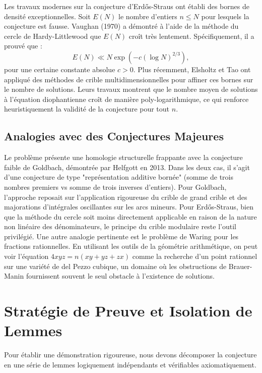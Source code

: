\documentclass[12pt, a4paper]{article}
\begin{document}
Les travaux modernes sur la conjecture d'Erd\H{o}s-Straus ont établi des bornes de densité exceptionnelles. Soit $E(N)$ le nombre d'entiers $n \le N$ pour lesquels la conjecture est fausse. Vaughan (1970) a démontré à l'aide de la méthode du cercle de Hardy-Littlewood que $E(N)$ croît très lentement. Spécifiquement, il a prouvé que :
\begin{equation}
E(N) \ll N \exp\left(-c (\log N)^{2/3}\right),
\end{equation}
pour une certaine constante absolue $c > 0$.
Plus récemment, Elsholtz et Tao ont appliqué des méthodes de crible multidimensionnelles pour affiner ces bornes sur le nombre de solutions. Leurs travaux montrent que le nombre moyen de solutions à l'équation diophantienne croît de manière poly-logarithmique, ce qui renforce heuristiquement la validité de la conjecture pour tout $n$.

\subsection{Analogies avec des Conjectures Majeures}
Le problème présente une homologie structurelle frappante avec la conjecture faible de Goldbach, démontrée par Helfgott en 2013. Dans les deux cas, il s'agit d'une conjecture de type "représentation additive bornée" (somme de trois nombres premiers vs somme de trois inverses d'entiers).
Pour Goldbach, l'approche reposait sur l'application rigoureuse du crible de grand crible et des majorations d'intégrales oscillantes sur les arcs mineurs. Pour Erd\H{o}s-Straus, bien que la méthode du cercle soit moins directement applicable en raison de la nature non linéaire des dénominateurs, le principe du crible modulaire reste l'outil privilégié.
Une autre analogie pertinente est le problème de Waring pour les fractions rationnelles. En utilisant les outils de la géométrie arithmétique, on peut voir l'équation $4xyz = n(xy+yz+zx)$ comme la recherche d'un point rationnel sur une variété de del Pezzo cubique, un domaine où les obstructions de Brauer-Manin fournissent souvent le seul obstacle à l'existence de solutions.

\newpage

\section{Stratégie de Preuve et Isolation de Lemmes}
Pour établir une démonstration rigoureuse, nous devons décomposer la conjecture en une série de lemmes logiquement indépendants et vérifiables axiomatiquement.
\end{document}
